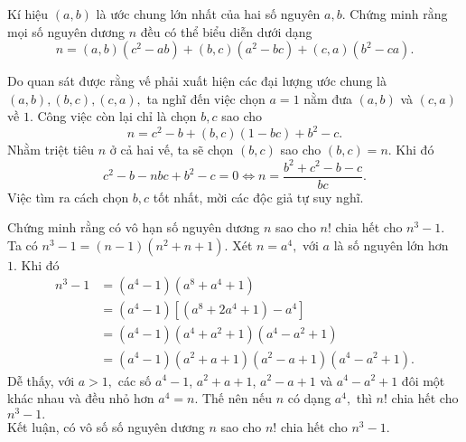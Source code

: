 \begin{gbtt}
Kí hiệu $(a,b)$ là ước chung lớn nhất của hai số nguyên $a,b.$ Chứng minh rằng mọi số nguyên dương $n$ đều có thể biểu diễn dưới dạng
\[n=(a,b)\left(c^2-ab\right)+(b,c)\left(a^2-bc\right)+(c,a)\left(b^2-ca\right).\]
\begin{luuy}
Do quan sát được rằng vế phải xuất hiện các đại lượng ước chung là $(a,b),(b,c),(c,a),$ ta nghĩ đến việc chọn $a=1$ nằm đưa $(a,b)$ và $(c,a)$ về $1.$ Công việc còn lại chỉ là chọn $b,c$ sao cho
$$n=c^2-b+(b,c)\left(1-bc\right)+b^2-c.$$
Nhằm triệt tiêu $n$ ở cả hai vế, ta sẽ chọn $(b,c)$ sao cho $(b,c)=n.$ Khi đó
$$c^2-b-nbc+b^2-c=0\Leftrightarrow n=\dfrac{b^2+c^2-b-c}{bc}.$$
Việc tìm ra cách chọn $b,c$ tốt nhất, mời các độc giả tự suy nghĩ.
\end{luuy}
\end{gbtt}


\begin{gbtt}
	Chứng minh rằng có vô hạn số nguyên dương $n$ sao cho $n!$ chia hết cho $n^3-1.$
	\loigiai
	{Ta có $n^3-1=(n-1)(n^2+n+1).$
		Xét $n=a^4,$ với $a$ là số nguyên lớn hơn $1.$
		Khi đó 
		{\allowdisplaybreaks
	\begin{align*}
		n^3-1&=\left(a^4-1\right)\left(a^8+a^4+1\right)\\
		&=\left(a^4-1\right)\left[(a^8+2a^4+1)-a^4\right]\\
		&=\left(a^4-1\right)\left(a^4+a^2+1\right)\left(a^4-a^2+1\right)\\
		&=
		\left(a^4-1\right)\left(a^2+a+1\right)\left(a^2-a+1\right)\left(a^4-a^2+1\right).
		\end{align*}}Dễ thấy, với $a>1,$ các số $a^4-1$, $a^2+a+1$, $a^2-a+1$ và $a^4-a^2+1$ đôi một khác nhau và đều nhỏ hơn $a^4=n.$
		Thế nên nếu $n$ có dạng $a^4,$ thì $n!$ chia hết cho $n^3-1.$ \\
		Kết luận, có vô số số nguyên dương $n$ sao cho $n!$ chia hết cho $n^3-1.$}
\end{gbtt}

